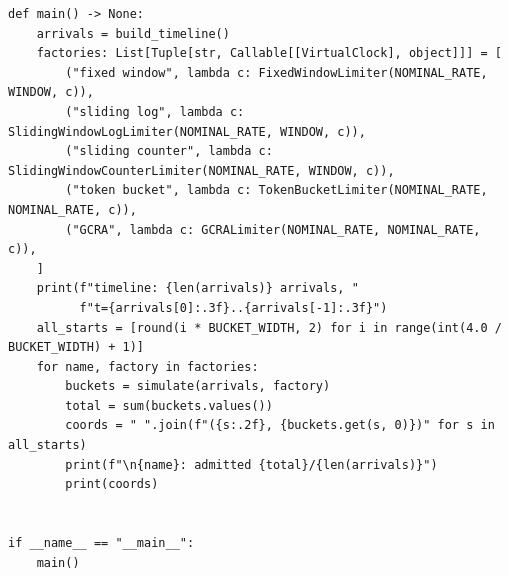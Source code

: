 \begin{verbatim}
def main() -> None:
    arrivals = build_timeline()
    factories: List[Tuple[str, Callable[[VirtualClock], object]]] = [
        ("fixed window", lambda c: FixedWindowLimiter(NOMINAL_RATE, WINDOW, c)),
        ("sliding log", lambda c: SlidingWindowLogLimiter(NOMINAL_RATE, WINDOW, c)),
        ("sliding counter", lambda c: SlidingWindowCounterLimiter(NOMINAL_RATE, WINDOW, c)),
        ("token bucket", lambda c: TokenBucketLimiter(NOMINAL_RATE, NOMINAL_RATE, c)),
        ("GCRA", lambda c: GCRALimiter(NOMINAL_RATE, NOMINAL_RATE, c)),
    ]
    print(f"timeline: {len(arrivals)} arrivals, "
          f"t={arrivals[0]:.3f}..{arrivals[-1]:.3f}")
    all_starts = [round(i * BUCKET_WIDTH, 2) for i in range(int(4.0 / BUCKET_WIDTH) + 1)]
    for name, factory in factories:
        buckets = simulate(arrivals, factory)
        total = sum(buckets.values())
        coords = " ".join(f"({s:.2f}, {buckets.get(s, 0)})" for s in all_starts)
        print(f"\n{name}: admitted {total}/{len(arrivals)}")
        print(coords)


if __name__ == "__main__":
    main()
\end{verbatim}

